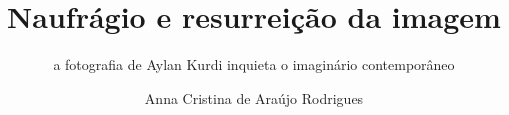 \documentclass[
  letterpaper,
  a4paper,
  12pt]{scrbook}
\title{Naufrágio e resurreição da imagem}
\subtitle{a fotografia de Aylan Kurdi inquieta o imaginário
contemporâneo}
\author{Anna Cristina de Araújo Rodrigues}
\date{}
\begin{document}

  \begin{frontmatter}

\begin{titlepage}


\newcommand{\titlepagepagealign}{
\ifthenelse{\equal{center}{right}}{\raggedleft}{}
\ifthenelse{\equal{center}{center}}{\centering}{}
\ifthenelse{\equal{center}{left}}{\raggedright}{}
}


\newcommand{\titleandsubtitle}{
{{\Huge{\textbf{\nohyphens{Naufrágio e resurreição da imagem:}}}}\par
}%

\vspace{\betweentitlesubtitle}
{
{\LARGE{\nohyphens{a fotografia de Aylan Kurdi inquieta o imaginário
contemporâneo}}}\par
}}
\newcommand{\titlepagetitleblock}{
\titleandsubtitle
}

\newcommand{\authorstyle}[1]{{\textbf{#1}}}

\newcommand{\affiliationstyle}[1]{{\large{#1}}}

\newcommand{\titlepageauthorblock}{
{\authorstyle{\nohyphens{Anna Cristina de Araújo Rodrigues}\\}}
}

\newcommand{\titlepageaffiliationblock}{
\hangindent=1em
\hangafter=1
{\affiliationstyle{


\vspace{1\baselineskip} 
}}
}
\newcommand{\headerstyled}{%
{}
}
\newcommand{\footerstyled}{%
{\Large{\textsc{}}}
}
\newcommand{\datestyled}{%
{}
}


\newcommand{\titlepageheaderblock}{\headerstyled}

\newcommand{\titlepagefooterblock}{
\footerstyled
}

\newcommand{\titlepagedateblock}{
\datestyled
}

\newcommand{\titleblock}{\newlength{\betweentitlesubtitle}
\setlength{\betweentitlesubtitle}{0.5cm}
{

{\titlepagetitleblock}
}

\vspace{1cm}
}

\newcommand{\authorblock}{{\titlepageauthorblock}

\vspace{2\baselineskip}
}


\end{titlepage}
\end{frontmatter}
\end{document}
